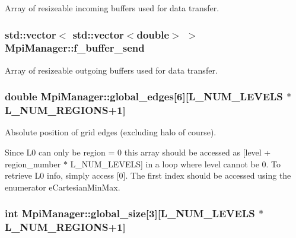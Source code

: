 Array of resizeable incoming buffers used for data transfer. 

\subsubsection[{\texorpdfstring{f\+\_\+buffer\+\_\+send}{f_buffer_send}}]{\setlength{\rightskip}{0pt plus 5cm}std\+::vector$<$ std\+::vector$<$double$>$ $>$ Mpi\+Manager\+::f\+\_\+buffer\+\_\+send}\hypertarget{class_mpi_manager_aafbb74832f69a915927b9bf252bd971d}{}\label{class_mpi_manager_aafbb74832f69a915927b9bf252bd971d}


Array of resizeable outgoing buffers used for data transfer. 

\subsubsection[{\texorpdfstring{global\+\_\+edges}{global_edges}}]{\setlength{\rightskip}{0pt plus 5cm}double Mpi\+Manager\+::global\+\_\+edges\mbox{[}6\mbox{]}\mbox{[}{\bf L\+\_\+\+N\+U\+M\+\_\+\+L\+E\+V\+E\+LS} $\ast${\bf L\+\_\+\+N\+U\+M\+\_\+\+R\+E\+G\+I\+O\+NS}+1\mbox{]}}\hypertarget{class_mpi_manager_a26f0512e19009451431d6d0ba59bf81a}{}\label{class_mpi_manager_a26f0512e19009451431d6d0ba59bf81a}


Absolute position of grid edges (excluding halo of course). 

Since L0 can only be region = 0 this array should be accessed as \mbox{[}level + region\+\_\+number $\ast$ L\+\_\+\+N\+U\+M\+\_\+\+L\+E\+V\+E\+LS\mbox{]} in a loop where level cannot be 0. To retrieve L0 info, simply access \mbox{[}0\mbox{]}. The first index should be accessed using the enumerator e\+Cartesian\+Min\+Max. 
\subsubsection[{\texorpdfstring{global\+\_\+size}{global_size}}]{\setlength{\rightskip}{0pt plus 5cm}int Mpi\+Manager\+::global\+\_\+size\mbox{[}3\mbox{]}\mbox{[}{\bf L\+\_\+\+N\+U\+M\+\_\+\+L\+E\+V\+E\+LS} $\ast${\bf L\+\_\+\+N\+U\+M\+\_\+\+R\+E\+G\+I\+O\+NS}+1\mbox{]}}\hypertarget{class_mpi_manager_a3cdf6e1ce19f22daa9e84bc88bf4382d}{}\label{class_mpi_manager_a3cdf6e1ce19f22daa9e84bc88bf4382d}


